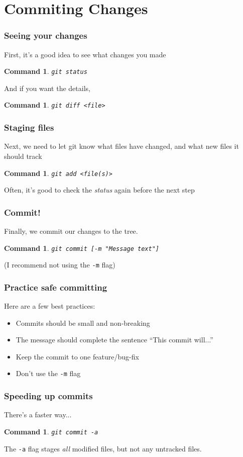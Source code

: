 \documentclass{beamer}
\newtheorem{command}[theorem]{Command}
\begin{document}
\section{Commiting Changes}

\begin{frame}
    \frametitle{Seeing your changes}
    First, it's a good idea to see what changes you made
    \begin{command}
        \texttt{git status}
    \end{command}
    \pause
    And if you want the details,
    \begin{command}
        \texttt{git diff <file>}
    \end{command}
\end{frame}

\begin{frame}
    \frametitle{Staging files}
    Next, we need to let git know what files have changed, and what new files it should track
    \begin{command}
        \texttt{git add <file(s)>}
    \end{command}
    \pause
    Often, it's good to check the \emph{status} again before the next step
\end{frame}

\begin{frame}
    \frametitle{Commit!}
    Finally, we commit our changes to the tree.
    \begin{command}
        \texttt{git commit [-m "Message text"]}
    \end{command}
    \pause
    (I recommend not using the \texttt{-m} flag)
\end{frame}


\begin{frame}
    \frametitle{Practice safe committing}
    Here are a few best practices:
    \begin{itemize}
        \item Commits should be small and non-breaking
        \item The message should complete the sentence ``This commit will...''
        \item Keep the commit to one feature/bug-fix
        \item Don't use the \texttt{-m} flag
    \end{itemize}
\end{frame}

\begin{frame}
    \frametitle{Speeding up commits}
    There's a faster way...
    \begin{command}
        \texttt{git commit -a}
    \end{command}
    The \texttt{-a} flag stages \emph{all} modified files, but not any untracked files.
\end{frame}
\end{document}
